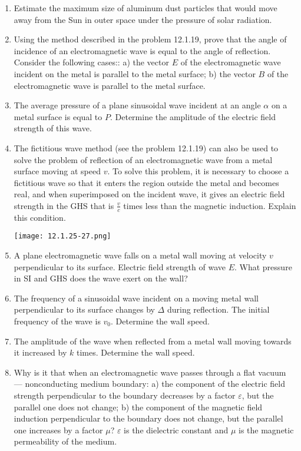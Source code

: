\documentclass{article}
\begin{document}
\begin{enumerate}[label=12.1.\arabic*]
\item Estimate the maximum size of aluminum dust particles that would move away from the Sun in outer space under the pressure of solar radiation. 

\item Using the method described in the problem 12.1.19, prove that the angle of incidence of an electromagnetic wave is equal to the angle of reflection. Consider the following cases:: a) the vector $E$ of the electromagnetic wave incident on the metal is parallel to the metal surface; b) the vector $B$ of the electromagnetic wave is parallel to the metal surface.

\item The average pressure of a plane sinusoidal wave incident at an angle $\alpha$ on a metal surface is equal to $P$. Determine the amplitude of the electric field strength of this wave.

\item The fictitious wave method (see the problem 12.1.19) can also be used to solve the problem of reflection of an electromagnetic wave from a metal surface moving at speed $v$. To solve this problem, it is necessary to choose a fictitious wave so that it enters the region outside the metal and becomes real, and when superimposed on the incident wave, it gives an electric field strength in the GHS that is $\frac{v}{c}$ times less than the magnetic induction. Explain this condition.

\begin{center}
    \texttt{[image: 12.1.25-27.png]}
\end{center}


\item A plane electromagnetic wave falls on a metal wall moving at velocity $v$ perpendicular to its surface. Electric field strength of wave $E$. What pressure in SI and GHS does the wave exert on the wall?

\item The frequency of a sinusoidal wave incident on a moving metal wall perpendicular to its surface changes by $\Delta$ during reflection. The initial frequency of the wave is $v_0$. Determine the wall speed.

\item The amplitude of the wave when reflected from a metal wall moving towards it increased by $k$ times. Determine the wall speed.

\item Why is it that when an electromagnetic wave passes through a flat vacuum — nonconducting medium boundary: a) the component of the electric field strength perpendicular to the boundary decreases by a factor $\varepsilon$, but the parallel one does not change; b) the component of the magnetic field induction perpendicular to the boundary does not change, but the parallel one increases by a factor $\mu$? $\varepsilon$ is the dielectric constant and $\mu$ is the magnetic permeability of the medium.


\end{enumerate}
\end{document}
